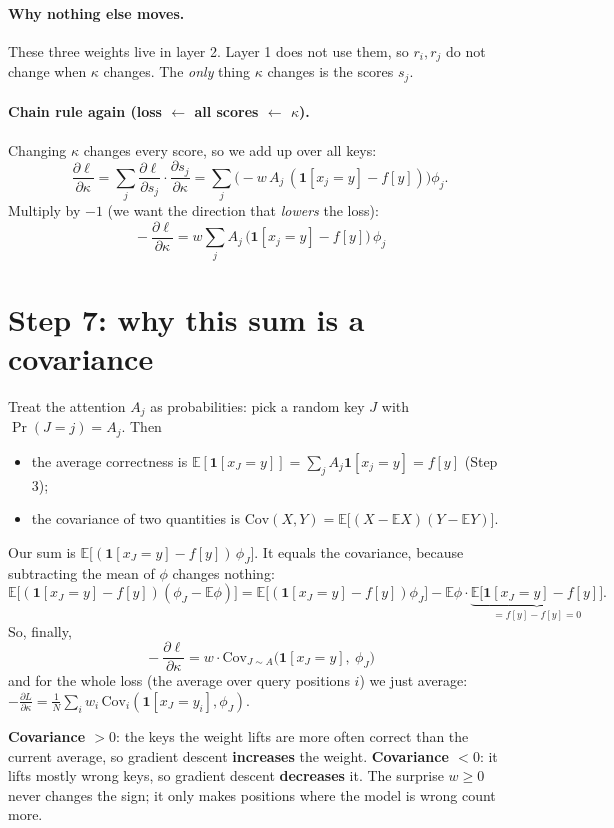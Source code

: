 \documentclass[11pt]{article}
\newcommand{\1}{\mathbf{1}}
\begin{document}
\paragraph{Why nothing else moves.} These three weights live in layer 2. Layer 1 does not use them, so
$r_i,r_j$ do not change when $\kappa$ changes. The \emph{only} thing $\kappa$ changes is the scores $s_j$.

\paragraph{Chain rule again (loss $\leftarrow$ all scores $\leftarrow$ $\kappa$).} Changing $\kappa$ changes every score,
so we add up over all keys:
\[
\frac{\partial\ell}{\partial\kappa}=\sum_j\frac{\partial\ell}{\partial s_j}\cdot\frac{\partial s_j}{\partial\kappa}
=\sum_j\Big(-w\,A_j\,(\1[x_j=y]-f[y])\Big)\phi_j .
\]
Multiply by $-1$ (we want the direction that \emph{lowers} the loss):
\[
\boxed{\ -\frac{\partial\ell}{\partial\kappa}=w\sum_jA_j\,\big(\1[x_j=y]-f[y]\big)\,\phi_j\ }
\]

\section{Step 7: why this sum is a covariance}
Treat the attention $A_j$ as probabilities: pick a random key $J$ with $\Pr(J=j)=A_j$. Then
\begin{itemize}
\item the average correctness is $\mathbb E[\1[x_J=y]]=\sum_jA_j\1[x_j=y]=f[y]$ (Step 3);
\item the covariance of two quantities is $\mathrm{Cov}(X,Y)=\mathbb E\big[(X-\mathbb EX)(Y-\mathbb EY)\big]$.
\end{itemize}
Our sum is $\mathbb E\big[(\1[x_J=y]-f[y])\,\phi_J\big]$. It equals the covariance, because subtracting the mean of
$\phi$ changes nothing:
\[
\mathbb E\big[(\1[x_J=y]-f[y])(\phi_J-\mathbb E\phi)\big]
=\mathbb E\big[(\1[x_J=y]-f[y])\phi_J\big]-\mathbb E\phi\cdot\underbrace{\mathbb E\big[\1[x_J=y]-f[y]\big]}_{=f[y]-f[y]=0}.
\]
So, finally,
\[
\boxed{\ -\frac{\partial\ell}{\partial\kappa}=w\cdot\mathrm{Cov}_{J\sim A}\big(\1[x_J=y],\ \phi_J\big)\ }
\]
and for the whole loss (the average over query positions $i$) we just average:
$-\frac{\partial L}{\partial\kappa}=\frac1N\sum_iw_i\,\mathrm{Cov}_i(\1[x_J=y_i],\phi_J)$.

\begin{idea}
\textbf{Covariance $>0$}: the keys the weight lifts are more often correct than the current average,
so gradient descent \textbf{increases} the weight. \textbf{Covariance $<0$}: it lifts mostly wrong keys,
so gradient descent \textbf{decreases} it. The surprise $w\ge0$ never changes the sign; it only makes
positions where the model is wrong count more.
\end{idea}
\end{document}
